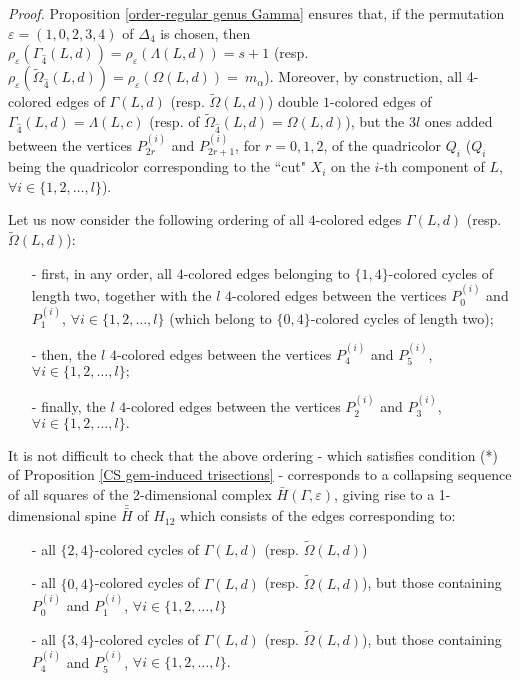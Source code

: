\documentclass[12pt,a4paper]{article}
\newcommand{\dimo}{\noindent \emph{Proof. }}
\newcommand{\e}{\varepsilon}
\newcommand{\G}{\Gamma}
\begin{document}
\dimo
Proposition \ref{order-regular genus Gamma} ensures that, if the permutation $\varepsilon = (1,0,2,3,4)$ of $\Delta_4$ is chosen, then $\rho_{\varepsilon}(\G_{\hat 4}(L,d))=\rho_{\varepsilon}(\Lambda(L,d)) = s + 1$ (resp. $\rho_{\varepsilon}(\tilde\Omega_{\hat 4}(L,d))=\rho_{\varepsilon}(\Omega(L,d)) = \  m_\alpha$). 
Moreover, by construction, all 4-colored edges of $\Gamma(L,d)$ (resp.  $\tilde \Omega(L,d)$) double $1$-colored edges of $\Gamma_{\hat 4}(L,d)= \Lambda(L,c)$ (resp. of  $\tilde \Omega_{\hat 4}(L,d) =\Omega(L,d)$), but the $3l$ ones added between the vertices $P_{2r}^{(i)}$ and $P_{2r+1}^{(i)}$, for $r=0,1,2$, of the quadricolor $Q_i$ ($Q_i$ being the quadricolor corresponding to the ``cut" $X_i$ on the $i$-th component of $L$, $\forall i \in \{1, 2, \dots, l\}$). 

Let us now consider the following ordering of all $4$-colored edges $\Gamma(L,d)$ (resp.  $\tilde \Omega(L,d)$): 
\begin{itemize}
    \item[-] first, in any order, all $4$-colored edges belonging to $\{1,4\}$-colored cycles of length two, together with the $l$ $4$-colored edges between the vertices $P_0^{(i)}$ and $P_{1}^{(i)}$, $\forall i \in \{1, 2, \dots, l\}$ (which belong to $\{0,4\}$-colored cycles of length two);
    \item[-] then, the $l$ $4$-colored edges between the vertices $P_4^{(i)}$ and $P_{5}^{(i)}$, $\forall i \in \{1, 2, \dots, l\};$ 
   
    \item[-] finally, the $l$ $4$-colored edges between the vertices $P_2^{(i)}$ and $P_{3}^{(i)}$, $\forall i \in \{1, 2, \dots, l\}.$ 
     
\end{itemize}
It is not difficult to check that the above ordering - which satisfies condition (*) of Proposition  \ref{CS gem-induced trisections} - corresponds to a collapsing sequence of all squares of the 2-dimensional complex $\bar H(\G, \e)$, giving rise to a 1-dimensional spine $\bar{\bar H}$ of  $H_{12}$ which consists of the edges corresponding to: 
\begin{itemize}
    \item[-] all $\{2,4\}$-colored cycles of $\Gamma(L,d)$ (resp.  $\tilde \Omega(L,d)$) 
    \item[-]  all $\{0,4\}$-colored cycles of $\Gamma(L,d)$ (resp.  $\tilde \Omega(L,d)$), but those containing  $P_0^{(i)}$ and $P_{1}^{(i)}$, $\forall i \in \{1, 2, \dots, l\}$
    \item[-]  all $\{3,4\}$-colored cycles of $\Gamma(L,d)$ (resp.  $\tilde \Omega(L,d)$), but those containing  $P_4^{(i)}$ and $P_{5}^{(i)}$, $\forall i \in \{1, 2, \dots, l\}.$  
\end{itemize}
\end{document}
